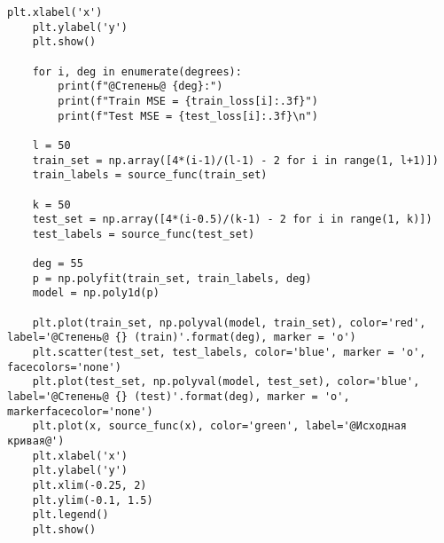 \begin{lstlisting}[label=lst:2,caption=Визуализация феномена Рунге]
	plt.xlabel('x')
	plt.ylabel('y')
	plt.show()
	
	for i, deg in enumerate(degrees):
		print(f"@Степень@ {deg}:")
		print(f"Train MSE = {train_loss[i]:.3f}")
		print(f"Test MSE = {test_loss[i]:.3f}\n")
	
	l = 50
	train_set = np.array([4*(i-1)/(l-1) - 2 for i in range(1, l+1)])
	train_labels = source_func(train_set)
	
	k = 50
	test_set = np.array([4*(i-0.5)/(k-1) - 2 for i in range(1, k)])
	test_labels = source_func(test_set)
	
	deg = 55
	p = np.polyfit(train_set, train_labels, deg)
	model = np.poly1d(p)
	
	plt.plot(train_set, np.polyval(model, train_set), color='red', label='@Степень@ {} (train)'.format(deg), marker = 'o')
	plt.scatter(test_set, test_labels, color='blue', marker = 'o', facecolors='none')
	plt.plot(test_set, np.polyval(model, test_set), color='blue', label='@Степень@ {} (test)'.format(deg), marker = 'o', markerfacecolor='none')
	plt.plot(x, source_func(x), color='green', label='@Исходная кривая@')
	plt.xlabel('x')
	plt.ylabel('y')
	plt.xlim(-0.25, 2)
	plt.ylim(-0.1, 1.5)
	plt.legend()
	plt.show()
\end{lstlisting}

\clearpage
